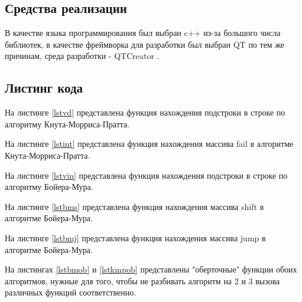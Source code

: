 \documentclass[a4paper, 14pt]{article}
\begin{document}
		\subsection{Средства реализации}
		В качестве языка программирования был выбран c++ \cite{c++} из-за большого числа библиотек, в качестве фреймворка для разработки был выбран QT \cite{qt} по тем же причинам, среда разработки - QTCreator \cite{qtc}.
        \subsection{Листинг кода}
        
		На листинге \ref{lstvd} представлена функция нахождения подстроки в строке по алгоритму Кнута-Морриса-Пратта.
  
        
\newpage
		На листинге \ref{lstint} представлена функция нахождения массива fail в алгоритме Кнута-Морриса-Пратта.
		
        

		На листинге \ref{lstvin} представлена функция нахождения подстроки в строке по алгоритму Бойера-Мура.
      
        
        
		На листинге \ref{lstbms} представлена функция нахождения массива shift в алгоритме Бойера-Мура.
      
        
\newpage

		На листинге \ref{lstbmj} представлена функция нахождения массива jump в алгоритме Бойера-Мура.
      
        
        
        На листингах \ref{lstbmob} и \ref{lstkmpob} представлены "оберточные" функции обоих алгоритмов, нужные для того, чтобы не разбивать алгоритм на 2 и 3 вызова различных функций соответственно.
\end{document}
